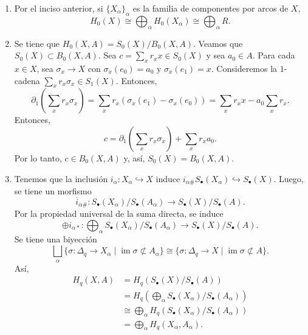 \documentclass[11pt,a4paper]{article}
\theoremstyle{plain}
\theoremstyle{definition}
\theoremstyle{remark}
\DeclareMathOperator{\im}{im}
\begin{document}
\begin{enumerate}[label=\arabic*.,leftmargin=*]
\begin{enumerate}[label=\alph*)]
Se tiene que $\bigsqcup_\alpha\iota_\alpha$ es suprayectiva. En efecto, sea
$\tau:\Delta_q\to X\in s_q(X)$. Como $\Delta_q$ es conexo por arcos y $\tau$
es continua, $\tau(\Delta_q)\subset X_\alpha$ para alguna $\alpha$. Así,
existe $\tau'\in s_q(X_\alpha)$ tal que $\iota_\alpha(\tau')=\tau$.

Ahora, sean $\sigma_1,\sigma_2\in s_q(X_\alpha)$ tales que
$\iota_\alpha(\sigma_1)=\iota_\alpha(\sigma_2)$. Entonces,
$i_\alpha\circ\sigma_1=i_\alpha\circ\sigma_2$. Como $i_\alpha$ es inyectiva
$\sigma_1=\sigma_2$. Supongamos ahora que $\sigma_1\in s_q(X_\alpha)$ y
$\sigma_2\in s_q(X_\beta)$ con $\alpha\ne\beta$ cumplen que
$\iota_\alpha(\sigma_1)=\iota_\beta(\sigma_2)$. Entonces
$i_\alpha\circ\sigma_1=i_\beta\circ\sigma_2$. Entonces, $\sigma_1(t)=\sigma_2(t)$
para toda $t\in\Delta_q$. Entonces, $X_\alpha\cap X_\beta\ne\varnothing$ y
$\alpha=\beta$. Contradicción.

Por lo tanto, se tiene un isomorfismo
$\bigoplus_\alpha\iota_\alpha:\bigoplus_\alpha S_q(X_\alpha)\cong S_q(X)$.
Así,
\[
H_q(X)=H_q\left(\bigoplus_\alpha S_\bullet(X_\alpha)\right)
\cong\bigoplus_\alpha H_q(S_\bullet(X_\alpha))
=\bigoplus_\alpha H_q(X_\alpha).
\]
\item Por el inciso anterior, si $\{X_\alpha\}_\alpha$ es la familia de
componentes por arcos de $X$,
\[
H_0(X)\cong\bigoplus_\alpha H_0(X_\alpha)\cong\bigoplus_\alpha R.
\]
\item Se tiene que $H_0(X,A)=S_0(X)/B_0(X,A)$. Veamos que
$S_0(X)\subset B_0(X,A)$. Sea $c=\sum_xr_xx\in S_0(X)$ y sea $a_0\in A$.
Para cada $x\in X$, sea $\sigma_x\to X$ con $\sigma_x(e_0)=a_0$ y
$\sigma_x(e_1)=x$. Consideremos la $1$-cadena $\sum_xr_x\sigma_x\in S_1(X)$.
Entonces,
\[
\partial_1\left(\sum_xr_x\sigma_x\right)=\sum_xr_x(\sigma_x(e_1)-\sigma_x(e_0))=\sum_xr_xx-a_0\sum_xr_x.
\]
Entonces,
\[
c=\partial_1\left(\sum_xr_x\sigma_x\right)+\sum_xr_xa_0.
\]
Por lo tanto, $c\in B_0(X,A)$ y, así, $S_0(X)=B_0(X,A)$.
\item Tenemos que la inclusión $i_\alpha:X_\alpha\hookrightarrow X$ induce
$i_{\alpha\#}S_\bullet(X_\alpha)\hookrightarrow S_\bullet(X)$. Luego, se
tiene un morfismo
\[
\overline i_{\alpha\#}:S_\bullet(X_\alpha)/S_\bullet(A_\alpha)\to S_\bullet(X)/S_\bullet(A).
\]
Por la propiedad universal de la suma directa, se induce
\[
\oplus i_{\alpha*}:\bigoplus_\alpha S_\bullet(X_\alpha)/S_\bullet(A_\alpha)\to S_\bullet(X)/S_\bullet(A).
\]
Se tiene una biyección
\[
\bigsqcup_\alpha\{\sigma:\Delta_q\to X_\alpha\mid\im\sigma\not\subset A_\alpha\}\cong\{\sigma:\Delta_q\to X\mid\im\sigma\not\subset A\}.
\]
Así,
\[
\begin{aligned}
H_q(X,A)&=H_q(S_\bullet(X)/S_\bullet(A))\\
&=H_q\left(\bigoplus_\alpha S_\bullet(X_\alpha)/S_\bullet(A_\alpha)\right)\\
&\cong\bigoplus_\alpha H_q(S_\bullet(X_\alpha)/S_\bullet(A_\alpha))\\
&=\bigoplus_\alpha H_q(X_\alpha,A_\alpha).
\end{aligned}
\]
\end{enumerate}


\end{enumerate}
\end{document}
